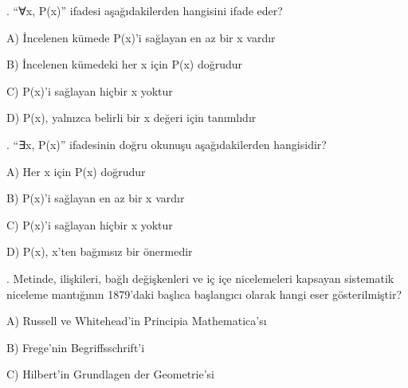 \par\smallskip{}. “∀x, P(x)” ifadesi aşağıdakilerden hangisini ifade eder?

\par\noindent\hspace*{1.6em}A) İncelenen kümede P(x)’i sağlayan en az bir x vardır

\par\noindent\hspace*{1.6em}B) İncelenen kümedeki her x için P(x) doğrudur

\par\noindent\hspace*{1.6em}C) P(x)’i sağlayan hiçbir x yoktur

\par\noindent\hspace*{1.6em}D) P(x), yalnızca belirli bir x değeri için tanımlıdır

\par\smallskip{}. “∃x, P(x)” ifadesinin doğru okunuşu aşağıdakilerden hangisidir?

\par\noindent\hspace*{1.6em}A) Her x için P(x) doğrudur

\par\noindent\hspace*{1.6em}B) P(x)’i sağlayan en az bir x vardır

\par\noindent\hspace*{1.6em}C) P(x)’i sağlayan hiçbir x yoktur

\par\noindent\hspace*{1.6em}D) P(x), x’ten bağımsız bir önermedir

\par\smallskip{}. Metinde, ilişkileri, bağlı değişkenleri ve iç içe nicelemeleri kapsayan sistematik niceleme mantığının 1879’daki başlıca başlangıcı olarak hangi eser gösterilmiştir?

\par\noindent\hspace*{1.6em}A) Russell ve Whitehead’in Principia Mathematica’sı

\par\noindent\hspace*{1.6em}B) Frege’nin Begriffsschrift’i

\par\noindent\hspace*{1.6em}C) Hilbert’in Grundlagen der Geometrie’si

